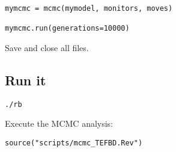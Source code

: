 {\tt \begin{snugshade*}
\begin{lstlisting}
mymcmc = mcmc(mymodel, monitors, moves)

mymcmc.run(generations=10000)
\end{lstlisting}
\end{snugshade*}}

{\begin{framed}
Save and close all files.
\end{framed}}

\bigskip
\subsection{Run it}\label{subsect:RB-RunMCMC}


{\tt \begin{snugshade*}
\begin{lstlisting}
./rb
\end{lstlisting}
\end{snugshade*}}

Execute the MCMC analysis:
{\tt \begin{snugshade*}
\begin{lstlisting}
source("scripts/mcmc_TEFBD.Rev")
\end{lstlisting}
\end{snugshade*}}

